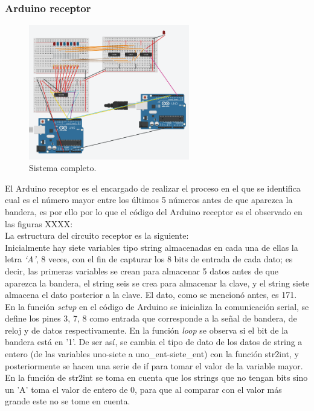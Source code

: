 \documentclass{article}
\begin{document}
\subsubsection{Arduino receptor}


\begin{figure}[h]
\includegraphics[width=7cm]{sistema_completo.PNG}
\centering
\caption{Sistema completo.}
\label{fig:sistema_completo.PNG}
\end{figure}


El Arduino receptor es el encargado de realizar el proceso en el que se identifica cual es el número mayor entre los últimos 5 números antes de que aparezca la bandera, es por ello por lo que el código del Arduino receptor es el observado en las figuras XXXX:\\



La estructura del circuito receptor es la siguiente:\\

Inicialmente hay siete variables tipo string almacenadas en cada una de ellas la letra \textit{‘A’}, 8 veces, con el fin de capturar los 8 bits de entrada de cada dato; es decir, las primeras variables se crean para almacenar 5 datos antes de que aparezca la bandera, el string seis se crea para almacenar la clave, y el string siete almacena el dato posterior a la clave. El dato, como se mencionó antes, es 171. \\

En la función \textit{setup} en el código de Arduino se inicializa la comunicación serial, se define los pines 3, 7, 8 como entrada que corresponde a la señal de bandera, de reloj y de datos respectivamente. En la función \textit{loop} se observa si el bit de la bandera está en '1'. De ser así, se cambia el tipo de dato de los datos de string a entero (de las variables uno-siete a uno_ent-siete_ent) con la función str2int, y posteriormente se hacen una serie de if para tomar el valor de la variable mayor. En la función de str2int se toma en cuenta que los strings que no tengan bits sino un 'A' toma el valor de entero de 0, para que al comparar con el valor más grande este no se tome en cuenta.
\end{document}
